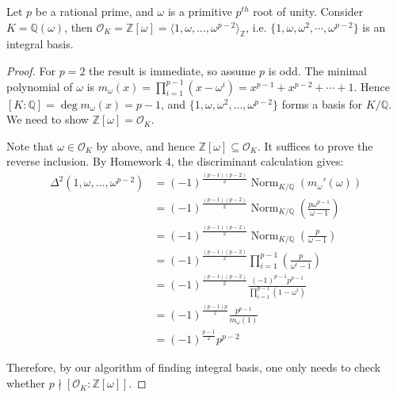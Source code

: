 \begin{theorem}
    Let $p$ be a rational prime, and $\omega$ is a primitive $p^{th}$ root of unity. Consider $K=\mathbb{Q}(\omega)$, then $\mathcal{O}_K=\mathbb{Z}[\omega] = \langle 1, \omega, \dots, \omega^{p-2} \rangle_{\mathbb{Z}}$, i.e. $\{1,\omega,\omega^2,\cdots,\omega^{p-2}\}$ is an integral basis.

\end{theorem}
\begin{proof}
For $p=2$ the result is immediate, so assume $p$ is odd. The minimal polynomial of $\omega$ is
$
m_\omega(x) = \prod_{i=1}^{p-1}(x-\omega^i) =x^{p-1} + x^{p-2} + \cdots + 1
.$ 
Hence $[K:\mathbb{Q}] = \deg m_\omega(x) = p-1$, and $\{1, \omega, \omega^2, \dotsc, \omega^{p-2}\}$ forms a basis for $K/\mathbb{Q}$. We need to show $\mathbb{Z}[\omega] = \mathcal{O}_K$. 

Note that $\omega \in \mathcal{O}_K$ by above, and hence $\mathbb{Z}[\omega] \subseteq \mathcal{O}_K$. It suffices to prove the reverse inclusion. By Homework 4, the discriminant calculation gives:
\begin{align*}
\Delta^2(1, \omega, \dotsc, \omega^{p-2}) &= (-1)^{\frac{(p-1)(p-2)}{2}} \operatorname{Norm}_{K/\mathbb{Q}}(m_\omega'(\omega)) \\
&= (-1)^{\frac{(p-1)(p-2)}{2}} \operatorname{Norm}_{K/\mathbb{Q}}\left(\frac{p\omega^{p-1}}{\omega - 1}\right) \\
&= (-1)^{\frac{(p-1)(p-2)}{2}} \operatorname{Norm}_{K/\mathbb{Q}}\left(\frac{p}{\omega - 1}\right) \\
&= (-1)^{\frac{(p-1)(p-2)}{2}} \prod_{i=1}^{p-1}\left(\frac{p}{\omega^{i} - 1}\right) \\
&= (-1)^{\frac{(p-1)(p-2)}{2}} \frac{(-1)^{p-1}p^{p-1}}{\prod_{i=1}^{p-1}\left({1-\omega^{i}}\right)} \\
&= (-1)^{\frac{(p-1)p}{2}} \frac{p^{p-1}}{m_{\omega}(1)} \\
&= (-1)^{\frac{p-1}{2}} p^{p-2}
\end{align*}

Therefore, by our algorithm of finding integral basis, one only needs to check whether $p \nmid [\mathcal{O}_K: \mathbb{Z}[\omega]]$.


\end{proof}
